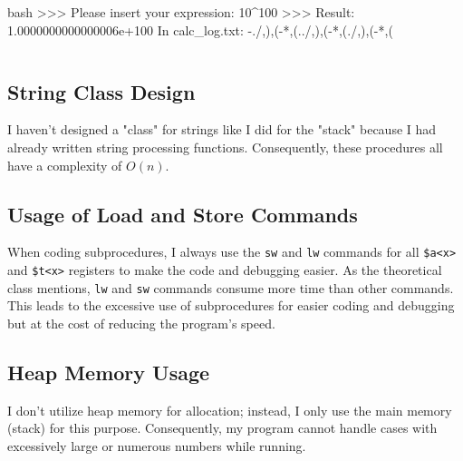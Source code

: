         \begin{code}{bash}
            >>> Please insert your expression: 10^100
            >>> Result: 1.0000000000000006e+100
            In calc_log.txt: 
                -./,),(-*,(../,),(-*,(./,),(-*,(
        \end{code}
        \begin{lstlisting}[language=bash, caption={Wrong result in \textit{.txt} file}]
        \end{lstlisting}

    \subsection{String Class Design}
        I haven't designed a "class" for strings like I did for the "stack" because I had already written string processing functions. Consequently, these procedures all have a complexity of \(O(n)\).
    
    \subsection{Usage of Load and Store Commands}
        When coding subprocedures, I always use the \texttt{sw} and \texttt{lw} commands for all \texttt{\$a<x>} and \texttt{\$t<x>} registers to make the code and debugging easier. As the theoretical class mentions, \texttt{lw} and \texttt{sw} commands consume more time than other commands. This leads to the excessive use of subprocedures for easier coding and debugging but at the cost of reducing the program's speed.
    
    \subsection{Heap Memory Usage}
        I don't utilize heap memory for allocation; instead, I only use the main memory (stack) for this purpose. Consequently, my program cannot handle cases with excessively large or numerous numbers while running.
    